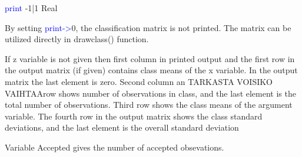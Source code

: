 \vspace{0.3cm}
\hline
\vspace{0.3cm}
\noindent \textcolor{blue}{print} \tabto{3cm} -1|1 \tabto{5cm}  Real \tabto{7cm}
\begin{changemargin}{3cm}{0cm}
\noindent  By setting \textcolor{blue}{print->}0, the classification matrix is not printed.
The matrix can be utilized directly in \textcolor{VioletRed}{drawclass}() function.
\end {changemargin}
\hline
\vspace{0.2cm}
\begin{note}
If z variable is not given then first column in printed output and the first row in the output
matrix (if given) contains class means of the x variable. In the output matrix the last element is
zero. Second column an TARKASTA VOISIKO VAIHTAArow shows number of observations in
class, and the last element is the total number of observations. Third row shows the class means
of the argument variable. The fourth row in the output matrix shows the class standard
deviations, and the last element is the overall standard deviation
\end{note}
\begin{note}
Variable Accepted gives the number of accepted obsevations.
\end{note}
